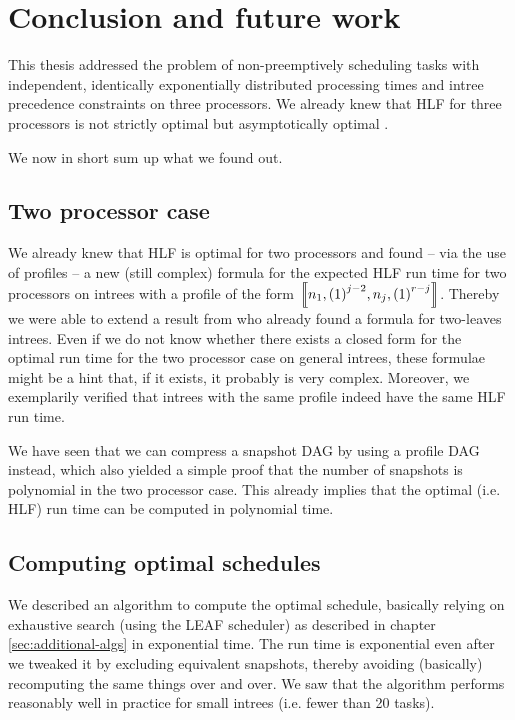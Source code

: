 \chapter{Conclusion and future work}
\label{chap:conclusion-outlook}

This thesis addressed the problem of non-preemptively scheduling tasks with independent, identically exponentially distributed processing times and intree precedence constraints on three processors. We already knew that HLF for three processors is not strictly optimal \cite{chandyreynoldsshortpaper1975} but asymptotically optimal \cite{journals/siamcomp/PapadimitriouT87}.

We now in short sum up what we found out.

\section{Two processor case}
\label{sec:conclusion-two-processor-case}

We already knew that HLF is optimal for two processors \cite{chandyreynoldsshortpaper1975} and found -- via the use of profiles -- a new (still complex) formula for the expected HLF run time for two processors on intrees with a profile of the form
$\left\llbracket n_1,{(1)}^{j-2},n_j,{(1)}^{r-j} \right\rrbracket$. Thereby we were able to extend a result from \cite{MoritzMaasDiploma} who already found a formula for two-leaves intrees. Even if we do not know whether there exists a closed form for the optimal run time for the two processor case on general intrees, these formulae might be a hint that, if it exists, it probably is very complex. Moreover, we exemplarily verified that intrees with the same profile indeed have the same HLF run time.

We have seen that we can compress a snapshot DAG by using a profile DAG instead, which also yielded a simple proof that the number of snapshots is polynomial in the two processor case. This already implies that the optimal (i.e. HLF) run time can be computed in polynomial time.

\section{Computing optimal schedules}
\label{sec:conclusion-optimal-schedules}

We described an algorithm to compute the optimal schedule, basically relying on exhaustive search (using the LEAF scheduler) as described in chapter \ref{sec:additional-algs} in exponential time. The run time is exponential even after we tweaked it by excluding equivalent snapshots, thereby avoiding (basically) recomputing the same things over and over. We saw that the algorithm performs reasonably well in practice for small intrees (i.e. fewer than 20 tasks).

